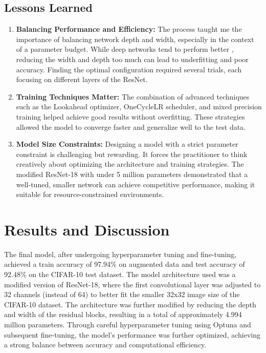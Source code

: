 \documentclass[twoside, 11pt]{article}
\begin{document}
\subsection{Lessons Learned}
\begin{enumerate}
    \item \textbf{Balancing Performance and Efficiency:} The process taught me the importance of balancing network depth and width, especially in the context of a parameter budget. While deep networks tend to perform better \cite{simonyan2014very}, reducing the width and depth too much can lead to underfitting and poor accuracy. Finding the optimal configuration required several trials, each focusing on different layers of the ResNet.
    \item \textbf{Training Techniques Matter:} The combination of advanced techniques such as the Lookahead optimizer, OneCycleLR scheduler, and mixed precision training helped achieve good results without overfitting. These strategies allowed the model to converge faster and generalize well to the test data.
    \item \textbf{Model Size Constraints:} Designing a model with a strict parameter constraint is challenging but rewarding. It forces the practitioner to think creatively about optimizing the architecture and training strategies. The modified ResNet-18 with under 5 million parameters demonstrated that a well-tuned, smaller network can achieve competitive performance, making it suitable for resource-constrained environments.
\end{enumerate}
\section{Results and Discussion}
\label{sec:results}
The final model, after undergoing hyperparameter tuning and fine-tuning, achieved a train accuracy of 97.94\% on augmented data and test accuracy of 92.48\% on the CIFAR-10 test dataset. The model architecture used was a modified version of ResNet-18, where the first convolutional layer was adjusted to 32 channels (instead of 64) to better fit the smaller 32x32 image size of the CIFAR-10 dataset. The architecture was further modified by reducing the depth and width of the residual blocks, resulting in a total of approximately 4.994 million parameters. Through careful hyperparameter tuning using Optuna and subsequent fine-tuning, the model's performance was further optimized, achieving a strong balance between accuracy and computational efficiency.


 
\end{document}
